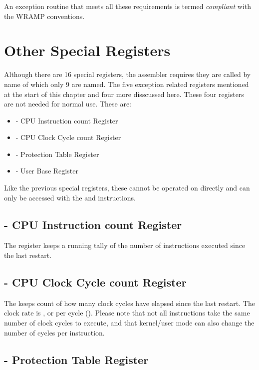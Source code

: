 An exception routine that meets all these requirements is termed {\em compliant}
with the WRAMP conventions.

\section{Other Special Registers}

Although there are 16 special registers, the assembler requires they are called by name of which only 9 are named.
The five exception related registers mentioned at the start of this chapter and four more disscussed here.  
These four registers are not needed for normal use.
These are:

\begin{itemize}
\item {} - CPU Instruction count Register
\item {} - CPU Clock Cycle count Register
\item {} - Protection Table Register
\item {} - User Base Register
\end{itemize}

Like the previous special registers, these cannot be operated on directly 
and can only be accessed with the  and  instructions.

\subsection{ - CPU Instruction count Register}

The  register keeps a running tally of the number of instructions 
executed since the last restart.

\subsection{ - CPU Clock Cycle count Register}

The  keeps count of how many clock cycles have elapsed since the 
last restart.
The clock rate is , or  per cycle ().
Please note that not all instructions take the same number of clock cycles to 
execute, and that kernel/user mode can also change the number of cycles per instruction.

\subsection{ - Protection Table Register}

